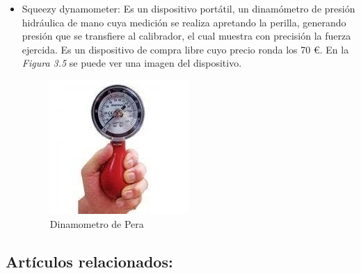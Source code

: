 \begin{itemize}
    \item Squeezy dynamometer: Es un dispositivo portátil, un dinamómetro de presión hidráulica de mano cuya medición se realiza apretando la perilla, generando presión que se transfiere al calibrador, el cual muestra con precisión la fuerza ejercida. Es un dispositivo de compra libre cuyo precio ronda los 70 €. En la \textit{Figura 3.5} se puede ver una imagen del dispositivo.
    
     \begin{figure}[h]
        \centering
        \includegraphics[width=0.5\textwidth]{img/Dinamometro pera.jpeg}
        \caption{Dinamometro de Pera}
        \label{fig:activforce}
    \end{figure}
\end{itemize}
\subsection{Artículos relacionados:}
